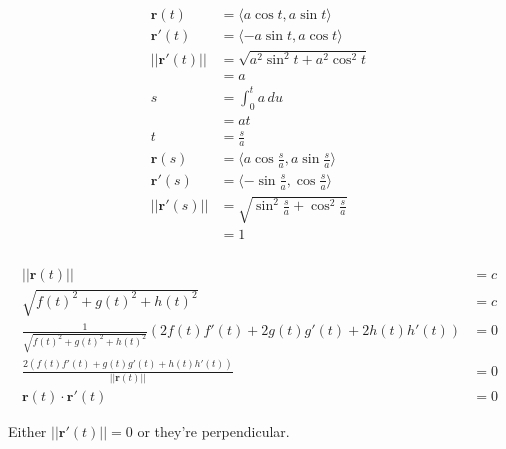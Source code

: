 \documentclass{article}
\begin{document}
\setcounter{subsubsection}{44}
\subsubsection{}

\begin{align*}
  \mathbf{r}(t)      & = \langle a \cos t, a \sin t \rangle                     \\
  \mathbf{r}'(t)     & = \langle -a \sin t, a \cos t \rangle                    \\
  ||\mathbf{r}'(t)|| & = \sqrt{a^2 \sin^2 t + a^2 \cos^2 t}                     \\
                     & = a                                                      \\
  s                  & = \int_0^t a \,du                                        \\
                     & = a t                                                    \\
  t                  & = \frac{s}{a}                                            \\
  \mathbf{r}(s)      & = \langle a \cos \frac{s}{a}, a \sin \frac{s}{a} \rangle \\
  \mathbf{r}'(s)     & = \langle -\sin \frac{s}{a}, \cos \frac{s}{a} \rangle    \\
  ||\mathbf{r}'(s)|| & = \sqrt{\sin^2 \frac{s}{a} + \cos^2 \frac{s}{a}}         \\
                     & = 1
\end{align*}

\setcounter{subsubsection}{46}
\subsubsection{}

\begin{align*}
  ||\mathbf{r}(t)||                                                                      & = c \\
  \sqrt{f(t)^2 + g(t)^2 + h(t)^2}                                                        & = c \\
  \frac{1}{\sqrt{f(t)^2 + g(t)^2 + h(t)^2}} (2 f(t) f'(t) + 2 g(t) g'(t) + 2 h(t) h'(t)) & = 0 \\
  \frac{2 (f(t) f'(t) + g(t) g'(t) + h(t) h'(t))}{||\mathbf{r}(t)||}                     & = 0 \\
  \mathbf{r}(t) \cdot \mathbf{r}'(t)                                                     & = 0
\end{align*}

Either $||\mathbf{r}'(t)|| = 0$ or they're perpendicular.
\end{document}
